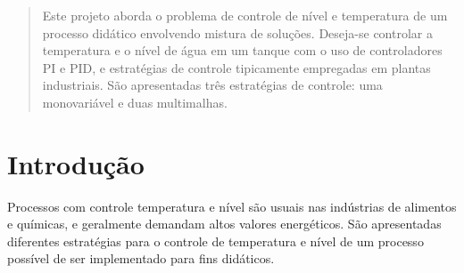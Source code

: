\documentclass[a0,portrait]{a0poster}
\begin{document}
\vspace{2cm} %


\begin{multicols}{2} %


\color{NavyBlue} %
\begin{abstract}

\fontsize{18}{22}
Este projeto aborda o problema de controle de nível e temperatura de um processo didático envolvendo mistura de soluções. Deseja-se controlar a temperatura e o nível de água em um tanque com o uso de controladores PI e PID, e estratégias de controle tipicamente empregadas em plantas industriais. São apresentadas três estratégias de controle: uma monovariável e duas multimalhas.

\end{abstract}
\vspace{0.5cm}

\color{DarkSlateGray} %

\section*{Introdução}

\color{Black}

Processos com controle temperatura e nível são usuais nas indústrias de alimentos e químicas, e geralmente demandam altos valores energéticos. São apresentadas diferentes estratégias para o controle de temperatura e nível de um processo possível de ser implementado para fins didáticos. 
\vspace{1cm}
\color{DarkSlateGray} %


\end{multicols}
\end{document}
